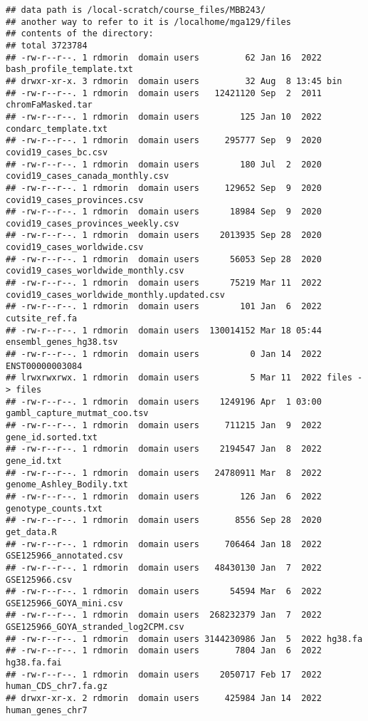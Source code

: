 \documentclass[
]{article}
\begin{document}
\begin{verbatim}
## data path is /local-scratch/course_files/MBB243/
## another way to refer to it is /localhome/mga129/files
## contents of the directory:
## total 3723784
## -rw-r--r--. 1 rdmorin  domain users         62 Jan 16  2022 bash_profile_template.txt
## drwxr-xr-x. 3 rdmorin  domain users         32 Aug  8 13:45 bin
## -rw-r--r--. 1 rdmorin  domain users   12421120 Sep  2  2011 chromFaMasked.tar
## -rw-r--r--. 1 rdmorin  domain users        125 Jan 10  2022 condarc_template.txt
## -rw-r--r--. 1 rdmorin  domain users     295777 Sep  9  2020 covid19_cases_bc.csv
## -rw-r--r--. 1 rdmorin  domain users        180 Jul  2  2020 covid19_cases_canada_monthly.csv
## -rw-r--r--. 1 rdmorin  domain users     129652 Sep  9  2020 covid19_cases_provinces.csv
## -rw-r--r--. 1 rdmorin  domain users      18984 Sep  9  2020 covid19_cases_provinces_weekly.csv
## -rw-r--r--. 1 rdmorin  domain users    2013935 Sep 28  2020 covid19_cases_worldwide.csv
## -rw-r--r--. 1 rdmorin  domain users      56053 Sep 28  2020 covid19_cases_worldwide_monthly.csv
## -rw-r--r--. 1 rdmorin  domain users      75219 Mar 11  2022 covid19_cases_worldwide_monthly.updated.csv
## -rw-r--r--. 1 rdmorin  domain users        101 Jan  6  2022 cutsite_ref.fa
## -rw-r--r--. 1 rdmorin  domain users  130014152 Mar 18 05:44 ensembl_genes_hg38.tsv
## -rw-r--r--. 1 rdmorin  domain users          0 Jan 14  2022 ENST00000003084
## lrwxrwxrwx. 1 rdmorin  domain users          5 Mar 11  2022 files -> files
## -rw-r--r--. 1 rdmorin  domain users    1249196 Apr  1 03:00 gambl_capture_mutmat_coo.tsv
## -rw-r--r--. 1 rdmorin  domain users     711215 Jan  9  2022 gene_id.sorted.txt
## -rw-r--r--. 1 rdmorin  domain users    2194547 Jan  8  2022 gene_id.txt
## -rw-r--r--. 1 rdmorin  domain users   24780911 Mar  8  2022 genome_Ashley_Bodily.txt
## -rw-r--r--. 1 rdmorin  domain users        126 Jan  6  2022 genotype_counts.txt
## -rw-r--r--. 1 rdmorin  domain users       8556 Sep 28  2020 get_data.R
## -rw-r--r--. 1 rdmorin  domain users     706464 Jan 18  2022 GSE125966_annotated.csv
## -rw-r--r--. 1 rdmorin  domain users   48430130 Jan  7  2022 GSE125966.csv
## -rw-r--r--. 1 rdmorin  domain users      54594 Mar  6  2022 GSE125966_GOYA_mini.csv
## -rw-r--r--. 1 rdmorin  domain users  268232379 Jan  7  2022 GSE125966_GOYA_stranded_log2CPM.csv
## -rw-r--r--. 1 rdmorin  domain users 3144230986 Jan  5  2022 hg38.fa
## -rw-r--r--. 1 rdmorin  domain users       7804 Jan  6  2022 hg38.fa.fai
## -rw-r--r--. 1 rdmorin  domain users    2050717 Feb 17  2022 human_CDS_chr7.fa.gz
## drwxr-xr-x. 2 rdmorin  domain users     425984 Jan 14  2022 human_genes_chr7

\end{verbatim}
\end{document}

